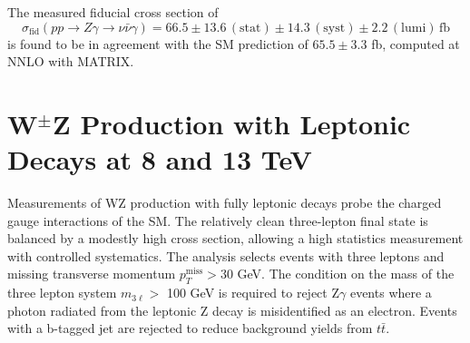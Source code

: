 \documentclass[10pt]{article}
\begin{document}
The measured fiducial cross section of
\begin{equation}
  \sigma_{\mathrm{fid}}(pp \rightarrow Z\gamma \rightarrow \nu\bar{\nu}\gamma) = 66.5 \pm 13.6 \, \mathrm{(stat)} \pm 14.3 \, 
        \mathrm{(syst)} \pm 2.2 \, \mathrm{(lumi)} \,\mathrm{fb}
\end{equation}
is found to be in agreement with the SM prediction of $65.5 \pm 3.3$ fb, computed at
NNLO with \textsc{MATRIX}. \cite{Grazzini:2015nwa}

\section{W$^{\pm}$Z Production with Leptonic Decays at 8 and 13 TeV}

Measurements of WZ production with fully leptonic decays probe the charged
gauge interactions of the SM. The relatively clean three-lepton final state
is balanced by a modestly high cross section, allowing a high statistics measurement 
with controlled systematics. The analysis selects events with three leptons and 
missing transverse momentum $p_{T}^{\mathrm{miss}} > 30$ GeV. The condition on the
mass of the three lepton system
$m_{3\ell} > $ 100 GeV is required to reject Z$\gamma$ events where a photon
radiated from the leptonic Z decay is misidentified as an electron. Events with
a b-tagged jet are rejected to reduce background yields from $t\bar{t}$.
\end{document}
